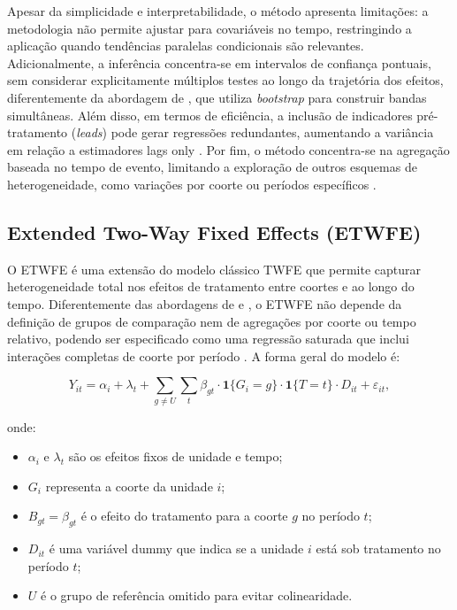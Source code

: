 \documentclass[12pt,a4paper,oneside]{article}
\begin{document}
		Apesar da simplicidade e interpretabilidade, o método apresenta limitações: a metodologia não permite ajustar para covariáveis no tempo, restringindo a aplicação quando tendências paralelas condicionais são relevantes. Adicionalmente, a inferência concentra-se em intervalos de confiança pontuais, sem considerar explicitamente múltiplos testes ao longo da trajetória dos efeitos, diferentemente da abordagem de \citet{Callaway2021}, que utiliza \textit{bootstrap} para construir bandas simultâneas. Além disso, em termos de eficiência, a inclusão de indicadores pré-tratamento (\textit{leads}) pode gerar regressões redundantes, aumentando a variância em relação a estimadores lags only \citep{Wooldridge2025}. Por fim, o método concentra-se na agregação baseada no tempo de evento, limitando a exploração de outros esquemas de heterogeneidade, como variações por coorte ou períodos específicos \citep{Callaway2021}.
		
		
		
		\subsection{Extended Two-Way Fixed Effects (ETWFE)}
		
		O ETWFE é uma extensão do modelo clássico TWFE que permite capturar heterogeneidade total nos efeitos de tratamento entre coortes e ao longo do tempo. Diferentemente das abordagens de \citet{Callaway2021} e \citet{Sun2021}, o ETWFE não depende da definição de grupos de comparação nem de agregações por coorte ou tempo relativo, podendo ser especificado como uma regressão saturada que inclui interações completas de coorte por período \citep{Wooldridge2023}. A forma geral do modelo é:
		
		\begin{equation}
			Y_{it} = \alpha_i + \lambda_t + \sum_{g \neq U} \sum_{t} \beta_{gt} \cdot \mathbf{1}\{G_i = g\} \cdot \mathbf{1}\{T = t\} \cdot D_{it} + \varepsilon_{it},
		\end{equation}
		
		onde:
		\begin{itemize}
			\item $\alpha_i$ e $\lambda_t$ são os efeitos fixos de unidade e tempo;
			\item $G_i$ representa a coorte da unidade $i$;
			\item $B_{gt} = \beta_{gt}$ é o efeito do tratamento para a coorte $g$ no período $t$;
			\item $D_{it}$ é uma variável dummy que indica se a unidade $i$ está sob tratamento no período $t$;
			\item $U$ é o grupo de referência omitido para evitar colinearidade.
		\end{itemize}
		
\end{document}
